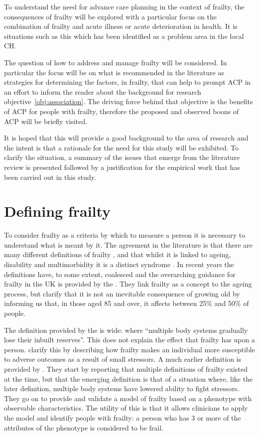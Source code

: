 \documentclass
[
	12pt,
	a4paper,
	oneside,
]{report}
\begin{document}
To understand the need for advance care planning in the context of frailty,
the consequences of frailty will be explored with a particular focus on the
combination of frailty and acute illness or acute deterioration in health. 
It is situations such as this which has been identified as a problem area
in the local CH.

The question of how to address and manage frailty will be considered. In 
particular the focus will be on what is recommended in the literature as 
strategies for determining the factors, in frailty, that can help to prompt
ACP in an effort to inform the reader about the background for research 
objective~\ref{obj:association}. The driving force behind that objective 
is the benefits of ACP for people with 
frailty, therefore the proposed and observed boons of ACP will be briefly 
visited.

It is hoped that this will provide a good background to the area of research
and the intent is that a rationale for the need for this study will be 
exhibited. To clarify the situation, a summary of the issues that emerge from
the literature review is presented followed by a justification for the
empirical work that has been carried out in this study.

\section{Defining frailty}

To consider frailty as a criteria by which to measure a person it is necessary
to understand what is meant by it. The agreement in the literature is that 
there are many different definitions of frailty
\parencite{ensrud:08,rockwood:05,conroy:09}, and that whilst it is linked to
ageing, disability and multimorbidity it is a distinct syndrome
\parencite{fried:01,conroy:09}. In recent years the definitions have, to some
extent, coalesced and the overarching guidance for frailty in the 
UK is provided by the \textcite{bgs:14}. They link frailty as a concept to the 
ageing process, but clarify that it is not an inevitable consequence of growing
old by informing us that, in those aged 85 and over, it affects between 25\% 
and 50\% of people. 

The definition provided by the \textcite[page 6]{bgs:14} is wide: where 
``multiple body systems gradually lose their inbuilt reserves''. 
This does not explain the effect that frailty has upon
a person. \textcite{clegg:13} clarify this by describing how frailty makes an
individual more susceptible to adverse outcomes as a result of small stressors.
A much earlier definition is provided by \textcite{fried:01}. They
start by reporting that multiple definitions of frailty existed at the time, 
but that the emerging definition is that of a situation where, like the later
definition, multiple body systems have lowered ability to fight stressors. 
They go on to provide and validate a model of frailty based on a phenotype
with observable characteristics. The utility of this is that it allows 
clinicians to apply the model and identify people with frailty: a person who has
3 or more of the attributes of the phenotype is considered to be frail. 
\end{document}
